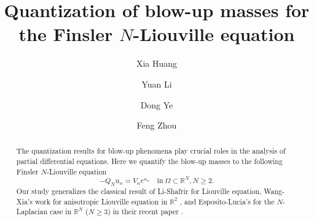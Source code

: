 \documentclass[11pt]{amsart}
\numberwithin{equation}{section}
\newcommand{\R}{\mathbb{R}}
\begin{document}
	\title[ Finsler $N$-Liouville Equation ]{Quantization of blow-up masses for the Finsler $N$-Liouville equation}
	
	\author[X.\ Huang]{Xia Huang}
	\author[Y.\ Li]{ Yuan Li}
\author[D.\ Ye]{ Dong Ye}
	\author[F.\ Zhou]{Feng Zhou}

	\address{School of Mathematical Sciences, East China Normal
Universit, Key Laboratory of MEA (Ministry of Education) and Shanghai Key Laboratory of PMMP, Shanghai, 200241, China}

	\address{School of Mathematical Sciences, East China Normal
Universit, Key Laboratory of MEA (Ministry of Education) and Shanghai Key Laboratory of PMMP, Shanghai, 200241, China}

	\address{School of Mathematical Sciences, East China Normal
Universit, Key Laboratory of MEA (Ministry of Education) and Shanghai Key Laboratory of PMMP, Shanghai, 200241, China}

	\address{School of Mathematical Sciences, East China Normal
Universit, Key Laboratory of MEA (Ministry of Education) and Shanghai Key Laboratory of PMMP, Shanghai, 200241, China\\
NYU-ECNU Institute of Mathematical Sciences at NYU-Shanghai, Shanghai 200120, China}


	\begin{abstract}
The quantization results for blow-up phenomena play crucial roles in the analysis of partial differential equations. Here we quantify the blow-up masses to the following Finsler $N$-Liouville equation $$-Q_{N}u_{n}=V_{n}e^{u_{n}}\quad\mbox{in}~ \Omega\subset \mathbb{R}^{N}, N \ge 2.$$
Our study generalizes the classical result of Li-Shafrir \cite{LS1994} for Liouville equation, Wang-Xia's work for anisotropic Liouville equation in $\R^2$ \cite{WX2012}, and Esposito-Lucia's for the $N$-Laplacian case in $\R^N$ ($N \geq 3$) in their recent paper \cite{EL2021}.
	\end{abstract}
	\maketitle
\end{document}
